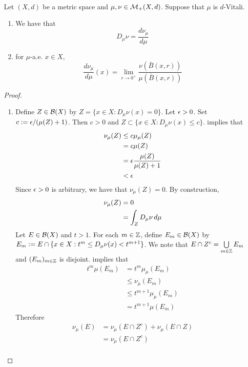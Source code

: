 \documentclass{book}
\begin{document}
	\begin{ex} 
		Let $(X, d)$ be a metric space and $\mu, \nu \in \mathcal{M}_+(X, d)$. Suppose that $\mu$ is $d$-Vitali.
		\begin{enumerate}
			\item We have that 
			$$D_{\mu} \nu = \frac{d\nu_{\mu}}{d\mu}$$
			\item for $\mu$-a.e. $x \in X$, 
			$$\frac{d\nu_{\mu}}{d\mu}(x) = \lim_{r \rightarrow 0^+} \frac{ \nu(\bar{B}(x, r))}{\mu(\bar{B}(x, r))}$$
		\end{enumerate}
	\end{ex}
	
	\begin{proof}\
		\begin{enumerate}
			\item Define $Z \in \mathcal{B}(X)$ by $Z = \{x \in X: D_{\mu}\nu(x) = 0\}$. Let $\epsilon > 0$. Set $c \vcentcolon= \epsilon/(\mu(Z) + 1)$. Then $c > 0$ and $Z \subset \{x \in X: D_{\mu}\nu(x) \leq c \}$.  implies that
			\begin{align*}
				\nu_{\mu}(Z) 
				& \leq c \mu_{\mu}(Z) \\
				& = c \mu(Z) \\
				& = \epsilon \frac{\mu(Z)}{\mu(Z) + 1} \\
				& < \epsilon 
			\end{align*} 
			Since $\epsilon > 0$ is arbitrary, we have that $\nu_{\mu}(Z) = 0$. By construction, 
			\begin{align*}
				\nu_{\mu}(Z) 
				& = 0 \\
				& = \int_{Z} D_{\mu}\nu \, d \mu 
			\end{align*} 
			Let $E \in \mathcal{B}(X)$ and $t > 1$. For each $m \in \mathbb{Z}$, define $E_m \in \mathcal{B}(X)$ by $E_m \vcentcolon= E \cap \{x \in X: t^m \leq D_{\mu}\nu(x) < t^{m+1}\}$. We note that $E \cap Z^c = \bigcup\limits_{m \in \mathbb{Z}} E_m$ and $(E_m)_{m \in \mathbb{Z}}$ is disjoint.  implies that 
			\begin{align*}
				t^m \mu(E_m)
				& = t^m\mu_{\mu}(E_m) \\
				& \leq \nu_{\mu}(E_m) \\
				& \leq t^{m+1}\mu_{\mu}(E_m) \\
				& = t^{m+1} \mu(E_m)
			\end{align*}
			Therefore
			\begin{align*}
				\nu_{\mu}(E)
				& = \nu_{\mu}(E \cap Z^c) + \nu_{\mu}(E \cap Z) \\
				& = \nu_{\mu}(E \cap Z^c) \\

\end{align*}
\end{enumerate}
\end{proof}
\end{document}
